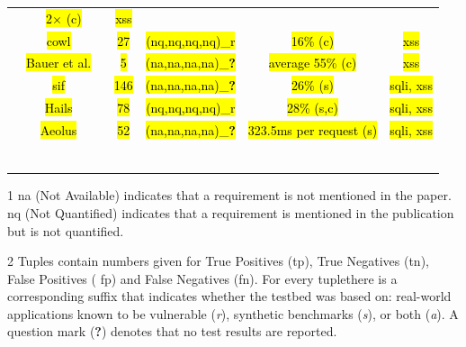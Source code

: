 \documentclass[10pt,journal,compsoc]{IEEEtran}
\makeatletter
\newcommand{\hlc}[2][yellow]{ {\sethlcolor{#1} \hl{#2}} }
\newcommand{\thickhline}{%
    \noalign {\ifnum 0=`}\fi \hrule height 1pt
    \futurelet \reserved@a \@xhline
}
\makeatother
\begin{document}
\begin{table}[t]
\begin{threeparttable}
\begin{small}
{\begin{tabular}{l|c|c|cc|c}
  & \hlc[yellow]{2$\times$ ({\sc c})} & \hlc[yellow]{{\sc xss}} \\
  &   \hlc[yellow]{{\sc cowl}}~\cite{SYMRHKM14} & \hlc[yellow]{27} & \hlc[yellow]{({\sc nq},{\sc nq},{\sc nq},{\sc nq})\_r}
  & \hlc[yellow]{16\% ({\sc c})} & \hlc[yellow]{{\sc xss}} \\
  &   \hlc[yellow]{Bauer et al.}~\cite{BCJPST15} & \hlc[yellow]{5} & \hlc[yellow]{({\sc na},{\sc na},{\sc na},{\sc na})\_{\bf ?}}
  & \hlc[yellow]{average 55\% ({\sc c})} & \hlc[yellow]{{\sc xss}} \\
  &   \hlc[yellow]{{\sc sif}}~\cite{CVMA07} & \hlc[yellow]{146} & \hlc[yellow]{({\sc na},{\sc na},{\sc na},{\sc na})\_{\bf ?}}
  & \hlc[yellow]{26\% ({\sc s})} & \hlc[yellow]{{\sc sql}i, {\sc xss}} \\
  &   \hlc[yellow]{Hails}~\cite{GLSTMMR12} & \hlc[yellow]{78} & \hlc[yellow]{({\sc nq},{\sc nq},{\sc nq},{\sc nq})\_r}
  & \hlc[yellow]{28\% ({\sc s},{\sc c})} & \hlc[yellow]{{\sc sql}i, {\sc xss}} \\
  &   \hlc[yellow]{Aeolus}~\cite{CPSPBCCSL12} & \hlc[yellow]{52} & \hlc[yellow]{({\sc na},{\sc na},{\sc na},{\sc na})\_{\bf ?}}
  & \hlc[yellow]{323.5ms per request ({\sc s})} & \hlc[yellow]{{\sc sql}i, {\sc xss}} \\
  \thickhline
    \end{tabular}}
    \vspace{-0.5mm}
    \begin{tablenotes}
  \begin{scriptsize}
        \item[1] {\sc na} (Not Available) indicates that a requirement is not mentioned in the paper.
  {\sc nq} (Not Quantified) indicates that a requirement is mentioned in the publication
  but is not quantified.
      \item[2] Tuples contain numbers given for True Positives
        ({\sc tp}), True Negatives ({\sc tn}), False Positives ({\sc
          fp}) and False Negatives ({\sc fn}). For every tuple\newline there is a corresponding suffix that indicates whether the testbed was
  based on: real-world applications known to be vulnerable ({\it r}),
  synthetic benchmarks ({\it s}), or both ({\it a}).
  A question mark ({\bf ?}) denotes that no test results are reported.

\end{scriptsize}
\end{tablenotes}
\end{small}
\end{threeparttable}
\end{table}
\end{document}
